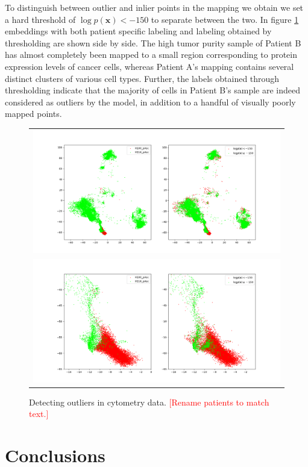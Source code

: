 To distinguish between outlier and inlier points in the mapping we obtain we set a hard threshold of $\log p(\mathbf{x}) < -150$ to separate between the two. In figure \ref{fig:cytometry_outliers} embeddings with both patient specific labeling and labeling obtained by thresholding are shown side by side. The high tumor purity sample of Patient B has almost completely been mapped to a small region corresponding to protein expression levels of cancer cells, whereas Patient A's mapping contains several distinct clusters of various cell types. Further, the labels obtained through thresholding indicate that the majority of cells in Patient B's sample are indeed considered as outliers by the model, in addition to a handful of visually poorly mapped points.

\begin{figure}[!htb]
  \centering
  \begin{tabular}{c}
    \includegraphics[width=\textwidth]{images/scored.png} \\
    \includegraphics[width=\textwidth]{images/scored_zoomed.png}
  \end{tabular}
  \caption{Detecting outliers in cytometry data. \textcolor{red}{[Rename patients to match text.]}}
  \label{fig:cytometry_outliers}
\end{figure}

\chapter{Conclusions}
\label{ch:conclusions}

